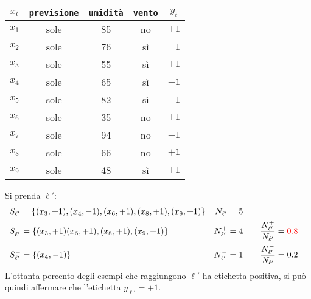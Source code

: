 \vspace{.7em}
\begin{minipage}{.49\textwidth}
    \captionsetup{type=table}
    \begin{center}
        \begin{tabular}{|c|c|c|c|c|} \hline
            $x_t$ & \texttt{previsione} & \texttt{umidità} & \texttt{vento} & $y_t$\\\hline
            \rowcolor{orange!40}$x_1$ & sole & 85 & no & $+1$\\
            \rowcolor{orange!40}$x_2$ & sole & 76 & sì & $-1$\\
            \rowcolor{cyan!40}  $x_3$ & sole & 55 & sì & $+1$\\
            \rowcolor{cyan!40}  $x_4$ & sole & 65 & sì & $-1$\\
            \rowcolor{orange!40}$x_5$ & sole & 82 & sì & $-1$\\
            \rowcolor{cyan!40}  $x_6$ & sole & 35 & no & $+1$\\
            \rowcolor{orange!40}$x_7$ & sole & 94 & no & $-1$\\
            \rowcolor{cyan!40}  $x_8$ & sole & 66 & no & $+1$\\
            \rowcolor{cyan!40}  $x_9$ & sole & 48 & sì & $+1$\\ \hline
        \end{tabular}
    \end{center}
\end{minipage}
\begin{minipage}{.49\textwidth}
    \captionsetup{type=figure}
    \centering
    
\end{minipage}

Si prenda $\ell'$:
$$
\begin{aligned}
    &S_{\ell'} = \{ (x_3,+1),(x_4,-1),(x_6,+1),(x_8,+1),(x_9,+1) \} & N_{\ell'}=5 \\
    &S_{\ell'}^+ = \{ (x_3,+1)(x_6,+1),(x_8,+1),(x_9,+1) \} & N_{\ell'}^+=4 
        & \qquad \frac{N_{\ell'}^+}{N_{\ell'}}={\color{red}0.8} \\
    &S_{\ell'}^- = \{ (x_4,-1) \} & N_{\ell'}^-=1 & \qquad \frac{N_{\ell'}^-}{N_{\ell'}}=0.2 \\
\end{aligned}
$$
L'{\color{red}ottanta percento} degli esempi che raggiungono $\ell'$ ha etichetta
positiva, si può quindi affermare che l'etichetta $y_{\ell'}=+1$.

